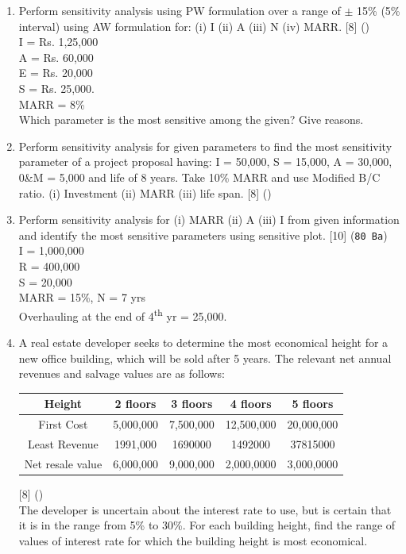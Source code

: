 \documentclass[12pt]{article}
\newcommand{\super}[1]{\textsuperscript{#1}}
\begin{document}
\begin{enumerate}
			\item Perform sensitivity analysis using PW formulation over a range of $\pm$ 15\% (5\% interval) using AW formulation for: (i) I (ii) A (iii) N (iv) MARR. \hfill [8] ()\\
			I = Rs. 1,25,000\\
			A = Rs. 60,000\\
			E = Rs. 20,000\\
			S = Rs. 25,000.\\
			MARR = 8\%\\
			Which parameter is the most sensitive among the given? Give reasons.

			\item Perform sensitivity analysis for given parameters to find the most sensitivity parameter of a project proposal having: I = 50,000, S = 15,000, A = 30,000, 0\&M = 5,000 and life of 8 years. Take 10\% MARR and use Modified B/C ratio. (i) Investment (ii) MARR (iii) life span. \hfill [8] ()
			
			\item Perform sensitivity analysis for (i) MARR (ii) A (iii) I from given information and identify the most sensitive parameters using sensitive plot. \hfill [10] (\texttt{80 Ba})\\
			I = 1,000,000\\
			R = 400,000\\
			S = 20,000\\
			MARR = 15\%, N = 7 yrs\\
			Overhauling at the end of 4\super{th} yr = 25,000.

			\item A real estate developer seeks to determine the most economical height for a new office building, which will be sold after 5 years. The relevant net annual revenues and salvage values are as follows:\\
			\begin{tabular}{|c|c|c|c|c|}
				\hline
				Height & 2 floors & 3 floors & 4 floors & 5 floors \\ \hline
				First Cost & 5,000,000 & 7,500,000 & 12,500,000 & 20,000,000 \\ \hline
				Least Revenue & 1991,000 & 1690000 & 1492000 & 37815000 \\ \hline
				Net resale value & 6,000,000 & 9,000,000 & 2,000,0000 & 3,000,0000 \\ \hline
			\end{tabular} \hfill [8] ()\\
			The developer is uncertain about the interest rate to use, but is certain that it is in the range from 5\% to 30\%. For each building height, find the range of values of interest rate for which the building height is most economical.


\end{enumerate}
\end{document}
